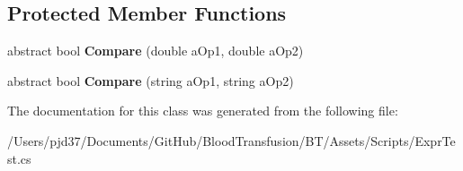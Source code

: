 \subsection*{Protected Member Functions}
\begin{DoxyCompactItemize}
\item 
abstract bool {\bfseries Compare} (double a\+Op1, double a\+Op2)\hypertarget{class_b83_1_1_logic_expression_parser_1_1_compare_statement_a94ee275c1487f33c70178242a643be40}{}\label{class_b83_1_1_logic_expression_parser_1_1_compare_statement_a94ee275c1487f33c70178242a643be40}

\item 
abstract bool {\bfseries Compare} (string a\+Op1, string a\+Op2)\hypertarget{class_b83_1_1_logic_expression_parser_1_1_compare_statement_a81c5449e336fec9fd3bd3a398be2f402}{}\label{class_b83_1_1_logic_expression_parser_1_1_compare_statement_a81c5449e336fec9fd3bd3a398be2f402}

\end{DoxyCompactItemize}


The documentation for this class was generated from the following file\+:\begin{DoxyCompactItemize}
\item 
/\+Users/pjd37/\+Documents/\+Git\+Hub/\+Blood\+Transfusion/\+B\+T/\+Assets/\+Scripts/Expr\+Test.\+cs\end{DoxyCompactItemize}
